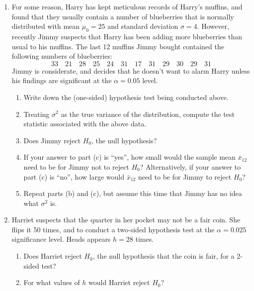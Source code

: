 \documentclass{article}    %
\begin{document}
	\begin{enumerate}[leftmargin=0.55cm]
		\item For some reason, Harry has kept meticulous records of Harry's muffins, and found that they usually contain a number of blueberries that is normally distributed with mean $\mu_0 = 25$ and standard deviation $\sigma = 4$. However, recently  Jimmy suspects that Harry has been adding more blueberries than usual to his muffins. The last 12 muffins Jimmy bought contained the following numbers of blueberries:
		$$
		33 \quad 21 \quad 28 \quad 25 \quad 24 \quad 31 \quad 17 \quad 31 \quad 29 \quad 30 \quad 29 \quad 31
		$$
		Jimmy is considerate, and decides that he doesn't want to alarm Harry unless his findings are significant at the $\alpha = 0.05$ level.
		\begin{enumerate}
			\item Write down the (one-sided) hypothesis test being conducted above.
			
			\item Treating $ \sigma^2 $ as the true variance of the distribution, compute the test statistic associated with the above data.
			
			\item Does Jimmy reject $H_0$, the null hypothesis?
			
			\item If your answer to part (c) is ``yes'', how small would the sample mean $\bar x_{12}$ need to be for Jimmy not to reject $H_0$? Alternatively, if your answer to part (c) is ``no'', how large would $\bar x_{12}$ need to be for Jimmy to reject $H_0$?
			
			\item Repeat parts (b) and (c), but assume this time that Jimmy has no idea what $\sigma^2$ is.
			
		\end{enumerate}	
		
		\item Harriet suspects that the quarter in her pocket may not be a fair coin. She flips it 50 times, and to conduct a two-sided hypothesis test at the $\alpha = 0.025$ significance level. Heads appears $h = 28$ times. 
		\begin{enumerate}
			\item Does Harriet reject $H_0$, the null hypothesis that the coin is fair, for a 2-sided test?
			
			\item For what values of $h$ would Harriet reject $H_0$?
			

\end{enumerate}
\end{enumerate}
\end{document}
